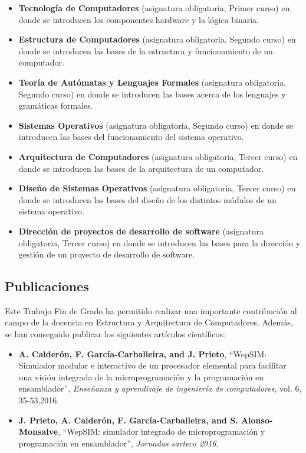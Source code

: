 \begin{itemize}

\item \textbf{Tecnología de Computadores} (asignatura obligatoria, Primer curso) en donde se introducen los componentes \gls{hardware} y la lógica binaria.

\item \textbf{Estructura de Computadores} (asignatura obligatoria, Segundo curso) en donde se introducen las bases de la estructura y funcionamiento de un computador.

\item \textbf{Teoría de Autómatas y Lenguajes Formales} (asignatura obligatoria, Segundo curso) en donde se introducen las bases acerca de los lenguajes y gramáticas formales.

\item \textbf{Sistemas Operativos} (asignatura obligatoria, Segundo curso) en donde se introducen las bases del funcionamiento del sistema operativo.

\item \textbf{Arquitectura de Computadores} (asignatura obligatoria, Tercer curso) en donde se introducen las bases de la arquitectura de un computador.

\item \textbf{Diseño de Sistemas Operativos} (asignatura obligatoria, Tercer curso) en donde se introducen las bases del diseño de los distintos módulos de un sistema operativo.

\item \textbf{Dirección de proyectos de desarrollo de \gls{software}} (asignatura obligatoria, Tercer curso) en donde se introducen las bases para la dirección y gestión de un proyecto de desarrollo de \gls{software}.

\end{itemize}

\subsection{Publicaciones}

Este Trabajo Fin de Grado ha permitido realizar una importante contribución al campo de la docencia en Estructura y Arquitectura de Computadores. Además, se han conseguido publicar los siguientes artículos científicos:

\begin{itemize}

\item \textbf{A. Calderón, F. García-Carballeira, and J. Prieto}, “WepSIM: Simulador modular e interactivo de un procesador elemental para facilitar una visión integrada de la microprogramación y la programación en ensamblador”, \textit{Enseñanza y aprendizaje de ingeniería de computadores}, vol. 6, 35-53,2016. \cite{mateos2016wepsim}

\item \textbf{J. Prieto, A. Calderón, F. García-Carballeira, and S. Alonso-Monsalve}, “WepSIM: simulador integrado de microprogramación y programación en ensamblador”, \textit{Jornadas sarteco 2016}. \cite{arcos2032}

\end{itemize}

